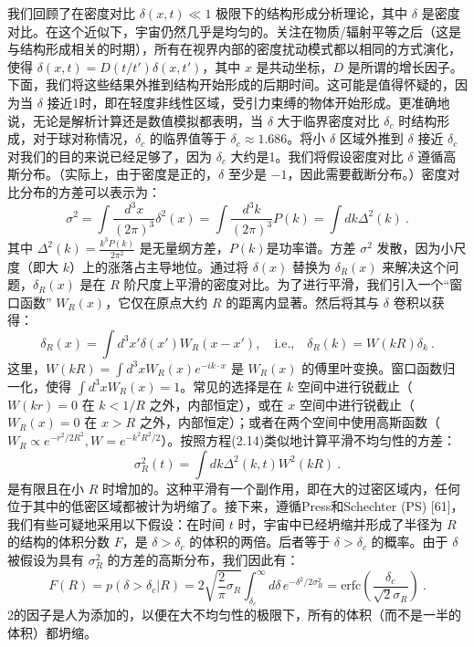 我们回顾了在密度对比 \( \delta(x, t) \ll 1 \) 极限下的结构形成分析理论，其中 \( \delta \) 是密度对比。在这个近似下，宇宙仍然几乎是均匀的。关注在物质/辐射平等之后（这是与结构形成相关的时期），所有在视界内部的密度扰动模式都以相同的方式演化，使得 \( \delta(x, t) = D(t/t')\delta(x, t') \)，其中 \( x \) 是共动坐标，\( D \) 是所谓的增长因子。下面，我们将这些结果外推到结构开始形成的后期时间。这可能是值得怀疑的，因为当 \( \delta \) 接近1时，即在轻度非线性区域，受引力束缚的物体开始形成。更准确地说，无论是解析计算还是数值模拟都表明，当 \( \delta \) 大于临界密度对比 \( \delta_c \) 时结构形成，对于球对称情况，\( \delta_c \) 的临界值等于 \( \delta_c \approx 1.686 \)。将小 \( \delta \) 区域外推到 \( \delta \) 接近 \( \delta_c \) 对我们的目的来说已经足够了，因为 \( \delta_c \) 大约是1。我们将假设密度对比 \( \delta \) 遵循高斯分布。（实际上，由于密度是正的，\( \delta \) 至少是 \( -1 \)，因此需要截断分布。）密度对比分布的方差可以表示为：
\begin{equation}
\sigma^2 = \int \frac{d^3x}{(2\pi)^3} \delta^2(x) = \int \frac{d^3k}{(2\pi)^3} P(k) = \int dk \Delta^2(k)~.
\end{equation}
其中 \( \Delta^2(k) = \frac{k^3 P(k)}{2\pi^2} \) 是无量纲方差，\( P(k) \)是功率谱。方差 \( \sigma^2 \) 发散，因为小尺度（即大 \( k \)）上的涨落占主导地位。通过将 \( \delta(x) \) 替换为 \( \delta_R(x) \) 来解决这个问题，\( \delta_R(x) \) 是在 \( R \) 阶尺度上平滑的密度对比。为了进行平滑，我们引入一个“窗口函数” \( W_R(x) \)，它仅在原点大约 \( R \) 的距离内显著。然后将其与 \( \delta \) 卷积以获得：
\begin{equation}
\delta_R(x) = \int d^3x' \delta(x') W_R(x - x'), \quad \text{i.e.,} \quad \delta_R(k) = W(kR) \delta_k~. 
\end{equation}
这里，\( W(kR) = \int d^3x W_R(x) e^{-ik \cdot x} \) 是 \( W_R(x) \) 的傅里叶变换。窗口函数归一化，使得 \( \int d^3x W_R(x) = 1 \)。常见的选择是在 \( k \) 空间中进行锐截止（\( W(kr) = 0 \) 在 \( k < 1/R \) 之外，内部恒定），或在 \( x \) 空间中进行锐截止（\( W_R(x) = 0 \) 在 \( x > R \) 之外，内部恒定）；或者在两个空间中使用高斯函数（\( W_R \propto e^{-r^2/2R^2}, W = e^{-k^2R^2/2} \)）。按照方程(2.14)类似地计算平滑不均匀性的方差：
\begin{equation}
\sigma_R^2(t) = \int dk \Delta^2(k, t) W^2(kR)~.
\end{equation}
是有限且在小 \( R \) 时增加的。这种平滑有一个副作用，即在大的过密区域内，任何位于其中的低密区域都被计为坍缩了。接下来，遵循Press和Schechter (PS) [61]，我们有些可疑地采用以下假设：在时间 \( t \) 时，宇宙中已经坍缩并形成了半径为 \( R \) 的结构的体积分数 \( F \)，是 \( \delta > \delta_c \) 的体积的两倍。后者等于 \( \delta > \delta_c \) 的概率。由于 \( \delta \) 被假设为具有 \( \sigma_R^2 \) 的方差的高斯分布，我们因此有：
\begin{equation}
F(R) = p(\delta > \delta_c|R) = 2 \sqrt{\frac{2}{\pi}\sigma_R} \int_{\delta_c}^\infty d\delta \, e^{-\delta^2/2\sigma_R^2} = \text{erfc} \left(\frac{\delta_c}{\sqrt{2}\sigma_R}\right)~.
\end{equation}
2的因子是人为添加的，以便在大不均匀性的极限下，所有的体积（而不是一半的体积）都坍缩。

